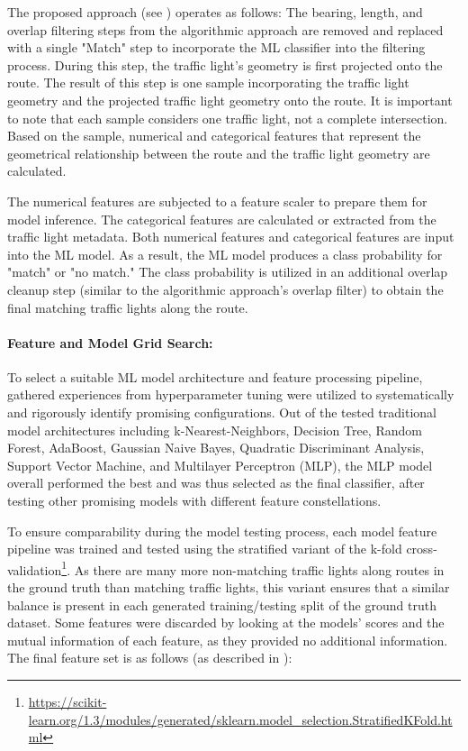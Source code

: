 The proposed approach (see ) operates as follows: The bearing, length, and overlap filtering steps from the algorithmic approach are removed and replaced with a single "Match" step to incorporate the ML classifier into the filtering process. During this step, the traffic light's geometry is first projected onto the route. The result of this step is one sample incorporating the traffic light geometry and the projected traffic light geometry onto the route. It is important to note that each sample considers one traffic light, not a complete intersection. Based on the sample, numerical and categorical features that represent the geometrical relationship between the route and the traffic light geometry are calculated.

The numerical features are subjected to a feature scaler to prepare them for model inference. The categorical features are calculated or extracted from the traffic light metadata. Both numerical features and categorical features are input into the ML model. As a result, the ML model produces a class probability for "match" or "no match." The class probability is utilized in an additional overlap cleanup step (similar to the algorithmic approach's overlap filter) to obtain the final matching traffic lights along the route.

\paragraph{Feature and Model Grid Search:} To select a suitable ML model architecture and feature processing pipeline, gathered experiences from hyperparameter tuning were utilized to systematically and rigorously identify promising configurations. Out of the tested traditional model architectures including k-Nearest-Neighbors, Decision Tree, Random Forest, AdaBoost, Gaussian Naive Bayes, Quadratic Discriminant Analysis, Support Vector Machine, and Multilayer Perceptron (MLP), the MLP model overall performed the best and was thus selected as the final classifier, after testing other promising models with different feature constellations. 

To ensure comparability during the model testing process, each model feature pipeline was trained and tested using the stratified variant of the k-fold cross-validation\footnote{\url{https://scikit-learn.org/1.3/modules/generated/sklearn.model_selection.StratifiedKFold.html}}. As there are many more non-matching traffic lights along routes in the ground truth than matching traffic lights, this variant ensures that a similar balance is present in each generated training/testing split of the ground truth dataset. Some features were discarded by looking at the models' scores and the mutual information of each feature, as they provided no additional information. The final feature set is as follows (as described in \cite{matthes2023geo}):

